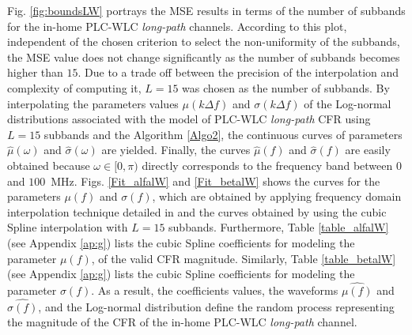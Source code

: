 Fig. \ref{fig:boundsLW} portrays the \ac{MSE} results in terms of the number of subbands for the in-home \ac{PLC}-\ac{WLC} \textit{long-path} channels. According to this plot, independent of the chosen criterion to select the non-uniformity of the subbands, the \ac{MSE} value does not change significantly as the number of subbands becomes higher than $15$. Due to a trade off between the precision of the interpolation and complexity of computing it, $L=15$ was chosen as the number of subbands. By interpolating the parameters values $\mu(k\Delta f)$ and $\sigma(k\Delta f)$ of the Log-normal distributions associated with the model of \ac{PLC}-\ac{WLC} \textit{long-path} \ac{CFR} using $L=15$ subbands and the Algorithm \ref{Algo2}, the continuous curves of parameters $\hat{\mu}(\omega)$ and $\hat{\sigma}(\omega)$ are yielded. Finally, the curves $\hat{\mu}(f)$ and $\hat{\sigma}(f)$ are easily obtained because $\omega \in [0,\pi)$ directly corresponds to the frequency band between $0$ and $100$~MHz. Figs. \ref{Fit_alfalW} and \ref{Fit_betalW} shows the curves for the parameters $\mu(f)$ and $\sigma(f)$, which are obtained by applying frequency domain interpolation technique detailed in \cite{mitra} and the curves obtained by using the cubic Spline interpolation with $L=15$ subbands. Furthermore, Table \ref{table_alfalW} (see Appendix \ref{ap:g}) lists the cubic Spline coefficients for modeling the parameter $\mu(f)$, of the valid \ac{CFR} magnitude. Similarly, Table \ref{table_betalW} (see Appendix \ref{ap:g}) lists the cubic Spline coefficients for modeling the parameter $\sigma(f)$. As a result, the coefficients values, the waveforms  $\hat{\mu(f)}$ and $\hat{\sigma(f)}$, and the Log-normal distribution define the random process representing the magnitude of the \ac{CFR} of the in-home \ac{PLC}-\ac{WLC} \textit{long-path} channel.

